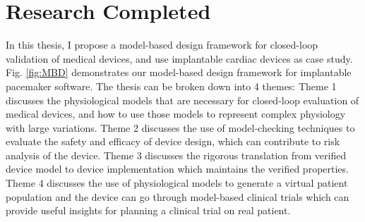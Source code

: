 \documentclass[a4paper,11pt]{article}
\begin{document}
\section{Research Completed}
In this thesis, I propose a model-based design framework for closed-loop validation of medical devices, and use implantable cardiac devices as case study.
Fig. \ref{fig:MBD} demonstrates our model-based design framework for implantable pacemaker software.
The thesis can be broken down into 4 themes:
Theme 1 discusses the physiological models that are necessary for closed-loop evaluation of medical devices, and how to use those models to represent complex physiology with large variations.
Theme 2 discusses the use of model-checking techniques to evaluate the safety and efficacy of device design, which can contribute to risk analysis of the device.
Theme 3 discusses the rigorous translation from verified device model to device implementation which maintains the verified properties.
Theme 4 discusses the use of physiological models to generate a virtual patient population and the device can go through model-based clinical trials which can provide useful insights for planning a clinical trial on real patient.
\end{document}
